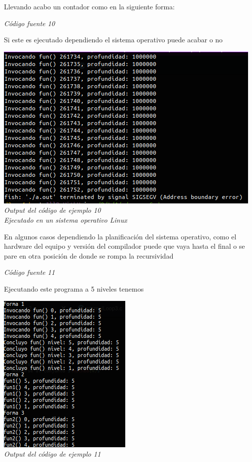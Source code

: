 \documentclass[10pt,executivepaper]{article}
\begin{document}
Llevando acabo un contador como en la siguiente forma:

\begin{center}
\textit{Código fuente 10}\\
\end{center}
Si este es ejecutado dependiendo el sistema operativo puede acabar o no
\begin{center}
\includegraphics[scale=0.5]{screens/screen4.png}\\
\textit{Output del código de ejemplo 10\\Ejecutado en un sistema operativo Linux}
\end{center}
En algunos casos dependiendo la planificación del sistema operativo, como el hardware del equipo y versión del compilador puede que vaya hasta el final o se pare en otra posición de donde se rompa la recursividad

\begin{center}
\textit{Código fuente 11}\\
\end{center}
Ejecutando este programa a 5 niveles tenemos
\begin{center}
\includegraphics[scale=0.5]{screens/screen5.png}\\
\textit{Output del código de ejemplo 11}
\end{center}
\end{document}
